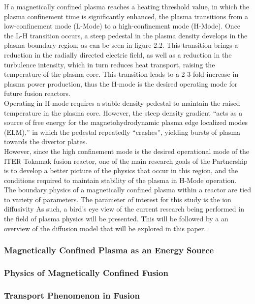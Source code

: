 \documentclass{article}
\begin{document}
If a magnetically confined plasma reaches a heating threshold value, in which the plasma confinement time is significantly enhanced, the plasma transitions from a low-confinement mode (L-Mode) to a high-confinement mode (H-Mode). Once the L-H transition occurs, a steep pedestal in the plasma density develops in the plasma boundary region, as can be seen in figure 2.2. This transition brings a reduction in the radially directed electric field, as well as a reduction in the turbulence intensity, which in turn reduces heat transport, raising the temperature of the plasma core. This transition leads to a 2-3 fold increase in plasma power production, thus the H-mode is the desired operating mode for future fusion reactors.\\



Operating in H-mode requires a stable density pedestal to maintain the raised temperature in the plasma core. However, the steep density gradient “acts as a source of free energy for the magnetohydrodynamic plasma edge localized modes (ELM),” in which the pedestal repeatedly “crashes”, yielding bursts of plasma towards the divertor plates. \\

However, since the high confinement mode is the desired operational mode of the ITER Tokamak fusion reactor, one of the main research goals of the Partnership is to develop a better picture of the physics that occur in this region, and the conditions required to maintain stability of the plasma in H-Mode operation.\\

 \cite{PPPL_P:2}
The boundary physics of a magnetically confined plasma within a reactor are tied to variety of parameters. The parameter of interest for this study is the ion diffusivity 
As such, a bird's eye view of the current research being performed in the field of plasma physics will be presented. \cite{J_Friedberg:1}
This will be followed by a an overview of the diffusion model that will be explored in this paper.\\
\subsubsection{Magnetically Confined Plasma as an Energy Source}
\subsubsection{Physics of Magnetically Confined Fusion}
\subsubsection{Transport Phenomenon in Fusion}
\newpage


\end{document}
